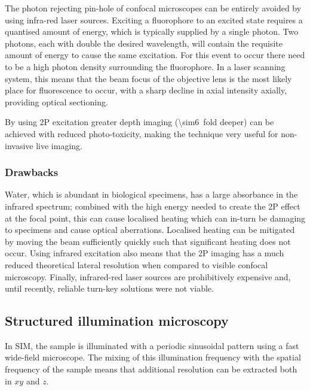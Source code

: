 The photon rejecting pin-hole of \gls{confocal microscope}s can be entirely avoided by using infra-red laser sources.
Exciting a \gls{fluorophore} to an excited state requires a quantised amount of energy, which is typically supplied by a single photon.
Two photons, each with double the desired wavelength, will contain the requisite amount of energy to cause the same excitation.
For this event to occur there need to be a high photon density surrounding the \gls{fluorophore}.
In a laser scanning system, this means that the beam focus of the \gls{objective lens} is the most likely place for fluorescence to occur, with a sharp decline in axial intensity axially, providing optical sectioning.

By using \gls{2P} excitation greater depth imaging (\SI{\sim6}{fold} deeper) can be achieved with reduced \gls{photo-toxicity}, making the technique very useful for non-invasive live imaging.

\subsubsection{Drawbacks}

Water, which is abundant in biological specimens, has a large absorbance in the infrared spectrum; combined with the high energy needed to create the \gls{2P} effect at the focal point, this can cause localised heating which can in-turn be damaging to specimens and cause optical \gls{aberration}s.
Localised heating can be mitigated by moving the beam sufficiently quickly such that significant heating does not occur.
Using infrared excitation also means that the \gls{2P} imaging has a much reduced theoretical lateral resolution when compared to visible confocal microscopy.
Finally, infrared-red laser sources are prohibitively expensive and, until recently, reliable turn-key solutions were not viable.

\subsection{Structured illumination microscopy}

In \gls{SIM}, the sample is illuminated with a periodic sinusoidal pattern using a fast \gls{wide-field} microscope.
The mixing of this illumination frequency with the spatial frequency of the sample means that additional resolution can be extracted both in $xy$ and $z$.

